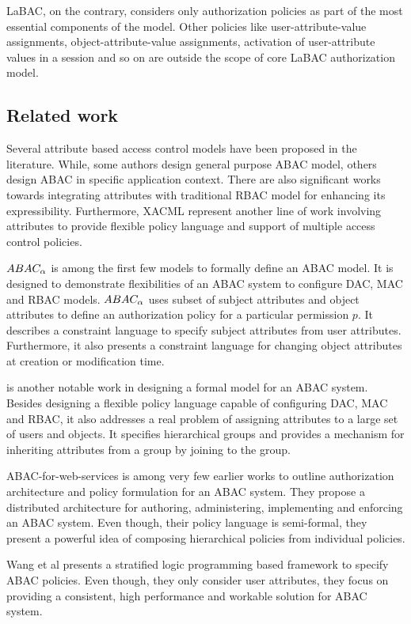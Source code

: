 	LaBAC, on the contrary,  considers only authorization policies as part of the most essential components of the model. Other policies like user-attribute-value assignments, object-attribute-value assignments, activation of user-attribute values in a session and so on are outside the scope of core LaBAC authorization model.
	
\subsection{Related work}

	Several attribute based access control models have been proposed in the literature. While, some authors design general purpose ABAC model, others design ABAC in specific application context. There are also significant works towards integrating attributes with traditional RBAC model for enhancing its expressibility. Furthermore, XACML represent another line of work involving attributes to provide flexible policy language and support of multiple access control policies.
	
	$ABAC_\alpha${} \cite{abacAlpha} is among the first few models to formally define an ABAC model. It is designed to demonstrate flexibilities of an ABAC system to configure DAC, MAC and RBAC models. $ABAC_\alpha${} uses subset of subject attributes and object attributes to define  an authorization policy for a particular permission $p$. It describes a constraint language to specify subject attributes from user attributes. Furthermore, it also presents a constraint language for changing object attributes at  creation or modification time.
	
	\hgabac{} \cite{hgabac} is another notable work in designing a formal model for an ABAC system. Besides designing a flexible policy language capable of  configuring DAC, MAC and RBAC, it also addresses a real problem of assigning attributes to a large set of users and objects. It specifies hierarchical groups and provides a mechanism for inheriting attributes from a group by joining to the group.

	ABAC-for-web-services \cite{abac-for-web-service} is among very few earlier works to outline authorization architecture and policy formulation for an ABAC system. They propose a distributed architecture for authoring, administering, implementing and enforcing an ABAC system. Even though, their policy language is semi-formal, they present a powerful idea of composing hierarchical policies from individual policies.
	
	Wang et al \cite{wang2004logic} presents a stratified logic programming based framework to specify ABAC policies. Even though, they only consider user attributes, they focus on providing a consistent, high performance and workable solution for ABAC system.
	

